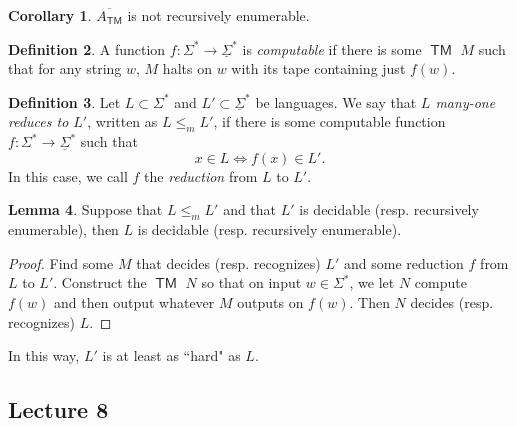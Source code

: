 \documentclass[10pt,letterpaper,cm]{nupset}
\theoremstyle{definition}
\newtheorem{definition}{Definition}[subsection]
\theoremstyle{theorem}
\newtheorem{lemma}[definition]{Lemma}
\newtheorem{corollary}[definition]{Corollary}
\theoremstyle{remark}
\newcommand{\1}{\mathbf{1}}
\newcommand{\0}{\vec 0}
\DeclareMathOperator{\TM}{\mathsf{TM}}
\begin{document}
\begin{corollary}
$\overline{A_{\TM}}$ is not recursively enumerable. 
\end{corollary}

\begin{definition}
A function $f: \Sigma^{\ast} \to \underline{\Sigma}^{\ast}$ is \textit{computable} if there is some $\TM$ $M$ such that for any string $w$, $M$ halts on $w$ with its tape containing just $f(w)$. 
\end{definition}

\begin{definition}
Let $L\subset \Sigma^{\ast}$ and $L' \subset \underline{\Sigma}^{\ast}$ be languages. We say that \textit{$L$ many-one reduces to $L'$}, written as $L \leq_m L'$, if there is some computable function $f: \Sigma^{\ast} \to \underline{\Sigma}^{\ast}$ such that $$x\in L \iff f(x) \in L'.$$ In this case, we call $f$ the \textit{reduction} from $L$ to $L'$.
\end{definition}

\begin{lemma}
Suppose that $L \leq_m L'$ and that $L'$ is decidable (resp. recursively enumerable), then $L$ is decidable (resp. recursively enumerable).
\end{lemma}
\begin{proof}
Find some $M$ that decides (resp. recognizes) $L'$ and some reduction $f$ from $L$ to $L'$. Construct the $\TM$ $N$ so that on input $w\in \Sigma^{\ast}$, we let $N$ compute $f(w)$ and then output whatever $M$ outputs on $f(w)$. Then $N$ decides (resp. recognizes) $L$. 
\end{proof}

In this way, $L'$ is at least as ``hard" as $L$.

\subsection{Lecture 8}
\end{document}
